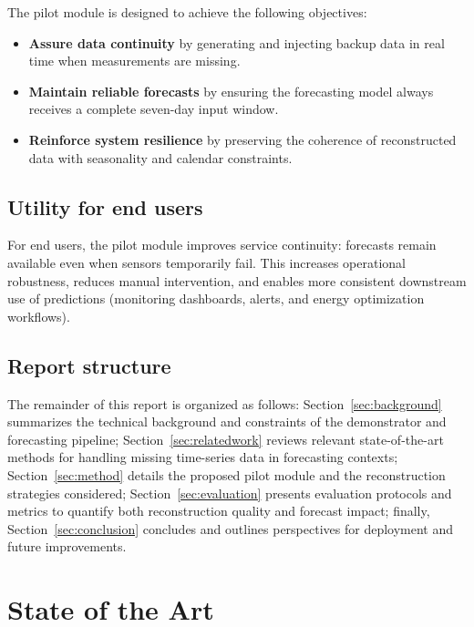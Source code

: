 The pilot module is designed to achieve the following objectives:
\begin{itemize}
    \item \textbf{Assure data continuity} by generating and injecting backup data in real time when measurements are missing.
    \item \textbf{Maintain reliable forecasts} by ensuring the forecasting model always receives a complete seven-day input window.
    \item \textbf{Reinforce system resilience} by preserving the coherence of reconstructed data with seasonality and calendar constraints.
\end{itemize}

\subsection{Utility for end users}
For end users, the pilot module improves service continuity: forecasts remain available even when sensors temporarily fail. This increases operational robustness, reduces manual intervention, and enables more consistent downstream use of predictions (monitoring dashboards, alerts, and energy optimization workflows).




\subsection{Report structure}
The remainder of this report is organized as follows: Section~\ref{sec:background} summarizes the technical background and constraints of the demonstrator and forecasting pipeline; Section~\ref{sec:relatedwork} reviews relevant state-of-the-art methods for handling missing time-series data in forecasting contexts; Section~\ref{sec:method} details the proposed pilot module and the reconstruction strategies considered; Section~\ref{sec:evaluation} presents evaluation protocols and metrics to quantify both reconstruction quality and forecast impact; finally, Section~\ref{sec:conclusion} concludes and outlines perspectives for deployment and future improvements.




\section{State of the Art}
